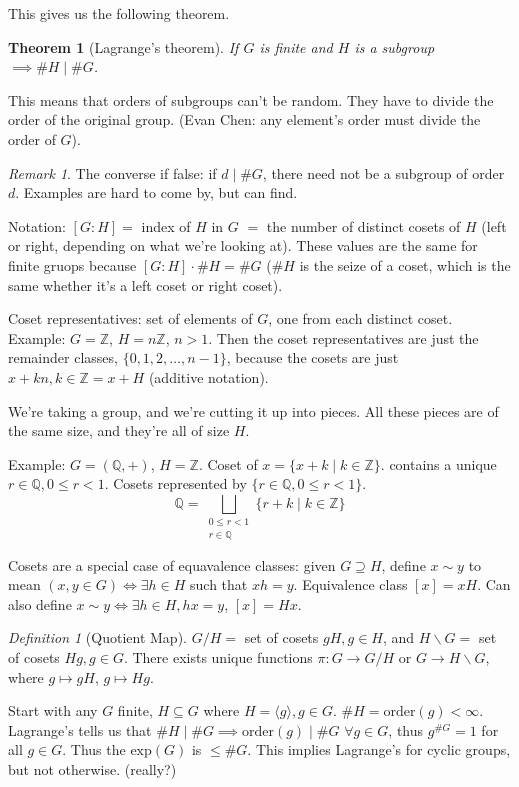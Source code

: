 \documentclass{article}
\theoremstyle{plain}
\newtheorem{theorem}{Theorem}
\theoremstyle{remark}
\newtheorem{definition}{Definition}
\newtheorem{remark}{Remark}
\newcommand{\Z}{{\mathbb Z}}
\newcommand{\Q}{{\mathbb Q}}
\begin{document}
This gives us the following theorem.
\begin{theorem}[Lagrange's theorem]
	If $G$ is finite and $H$ is a subgroup $\implies \#H \mid \#G$.
\end{theorem}
This means that orders of subgroups can't be random.
They have to divide the order of the original group.
(Evan Chen: any element's order must divide the order of $G$).
\begin{remark}
	The converse if false: if $d \mid \# G$,
	there need not be a subgroup of order $d$.
	Examples are hard to come by, but can find.
\end{remark}

Notation: $[G \colon H] = $ index of $H$ in $G$ $ = $ the number of distinct cosets of $H$
(left or right, depending on what we're looking at).
These values are the same for finite gruops because $[G \colon H] \cdot \# H = \# G$
($\#H$ is the seize of a coset, which is the same whether it's a left coset or right coset).

Coset representatives: set of elements of $G$,
one from each distinct coset.
Example: $G = \Z$, $H = n\Z$, $n>1$.
Then the coset representatives are just the remainder classes,
$\{0,1,2,\dots,n-1\}$,
because the cosets are just $x + kn, k \in \Z = x + H$ (additive notation).

We're taking a group, and we're cutting it up into pieces.
All these pieces are of the same size, and they're all of size $H$.

Example: $G = (\Q, +)$, $H = \Z$.
Coset of $x = \{x + k \mid k \in \Z \}$. contains a unique
$r \in \Q ,0 \leq r < 1$.
Cosets represented by $\{ r \in \Q, 0 \leq r < 1\}$.
\[
	\Q = \bigsqcup_{\substack{0\leq r<1 \\ r\in\Q}} \{r + k \mid k \in \Z\}
\]

Cosets are a special case of equavalence classes:
given $G \supseteq H$, define $x \sim y$ to mean
$(x,y \in G) \iff \exists h \in H$ such that $xh = y$.
Equivalence class $[x] = xH$.
Can also define $x \sim y \iff \exists h \in H, hx = y$, $[x] = Hx$.

\begin{definition}[Quotient Map]
	$G / H =$ set of cosets $gH, g \in H$,
	and $H \backslash G = $ set of cosets $Hg, g \in G$.
	There exists unique functions $\pi \colon G \to G / H$ or $G \to H\backslash G$,
	where $g \mapsto gH$, $g \mapsto Hg$.
\end{definition}


Start with any $G$ finite, $H \subseteq G$ where $H = \langle g \rangle, g \in G$.
$\# H = \mathrm{order}(g) < \infty$.
Lagrange's tells us that $\# H \mid \# G \implies \mathrm{order}(g) \mid \# G$ $\forall g \in G$,
thus $g^{\# G} = 1$ for all $g \in G$.
Thus the $\mathrm{exp}(G)$ is $\leq \# G$.
This implies Lagrange's for cyclic groups, but not otherwise. (really?)
\end{document}

